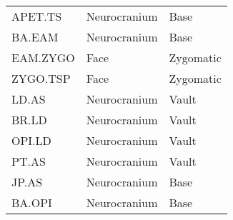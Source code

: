 \begin {table}[hp]
\begin {tabularx} {\textwidth} {X X X}
    APET.TS & Neurocranium & Base \\
    BA.EAM & Neurocranium & Base \\
    EAM.ZYGO & Face & Zygomatic \\
    ZYGO.TSP & Face & Zygomatic \\
    LD.AS & Neurocranium & Vault \\
    BR.LD & Neurocranium & Vault \\
    OPI.LD & Neurocranium & Vault \\
    PT.AS & Neurocranium & Vault \\
    JP.AS & Neurocranium & Base \\
    BA.OPI & Neurocranium & Base \\
  \end {tabularx}
  \hr
\end {table} %